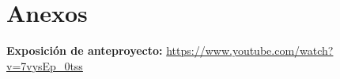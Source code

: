\chapter{Anexos}
\label{apx:apendice}
\textbf{Exposición de anteproyecto:} \url{https://www.youtube.com/watch?v=7vysEp_0tss}


